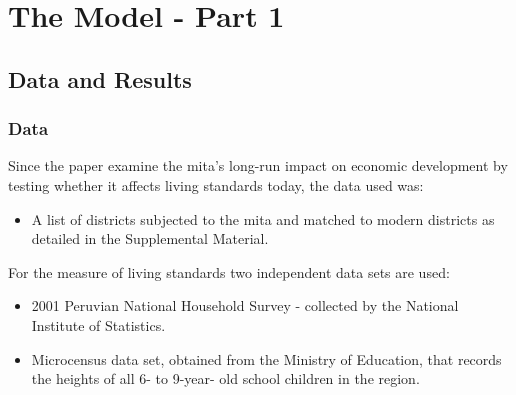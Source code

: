 \section{The Model - Part 1}
\subsection{Data and Results}



\begin{frame}
\frametitle{Data}

Since the paper examine the mita’s long-run impact on economic development by testing whether it affects living standards today, the data used was:

    \begin{itemize}

\item A list of districts subjected to the mita and matched to modern districts as detailed in the Supplemental Material.

    \end{itemize}
    For the measure of living standards two independent data sets are used:
    \begin{itemize}

\item 2001 Peruvian National Household Survey - collected by the National Institute of Statistics.\\[10pt]
\item Microcensus data set, obtained from the Ministry of Education, that records the heights of all 6- to 9-year- old school children in the region.

    \end{itemize}
  
\end{frame}



